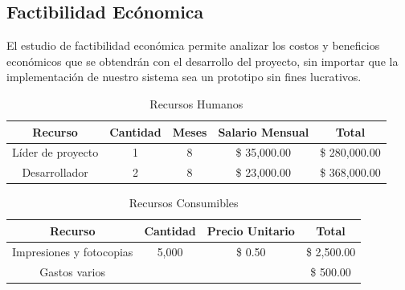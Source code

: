 \subsection{Factibilidad Ecónomica}

El estudio de factibilidad económica permite analizar los costos y beneficios económicos que se obtendrán con el desarrollo del proyecto, sin importar que la implementación de nuestro sistema sea un prototipo sin fines lucrativos. 

\begin{table} 
	\begin{center}
		\begin{tabular}{|c|c|c|c|c|}
			\hline \rowcolor[RGB]{0,102,204} 
			\textcolor{blanco}{\bf Recurso} &
				\textcolor{blanco}{\bf Cantidad} &
				\textcolor{blanco}{\bf Meses} &
				\textcolor{blanco}{\bf Salario Mensual} &
				\textcolor{blanco}{\bf Total} \\
			\hline \rowcolor[RGB]{224,224,224} 
				Líder de proyecto &
				1 &
				8 &
				\$ 35,000.00 &
				\$ 280,000.00 \\
      		\hline 
      			Desarrollador &
				2 &
				8 &
				\$ 23,000.00 &
				\$ 368,000.00 \\
      		\hline 
    		\end{tabular}
	\end{center}
	\caption[Recursos Humanos]{Recursos Humanos \cite{salarios}} 
	\label{tab:recursosHumanos}
\end{table}

\begin{table} 
	\begin{center}
		\begin{tabular}{|c|c|c|c|}
			\hline \rowcolor[RGB]{0,102,204} 
			\textcolor{blanco}{\bf Recurso} &
				\textcolor{blanco}{\bf Cantidad} &
				\textcolor{blanco}{\bf Precio Unitario} &
				\textcolor{blanco}{\bf Total} \\
			\hline \rowcolor[RGB]{224,224,224} 
				Impresiones y fotocopias &
				5,000 &
				\$ 0.50 &
				\$ 2,500.00  \\
      		\hline 
      			Gastos varios &
				&
				&
				\$ 500.00 \\
      		\hline 
    		\end{tabular}
	\end{center}
	\caption[Recursos Consumibles]{Recursos Consumibles} 
	\label{tab:recursosConsumibles}
\end{table}


